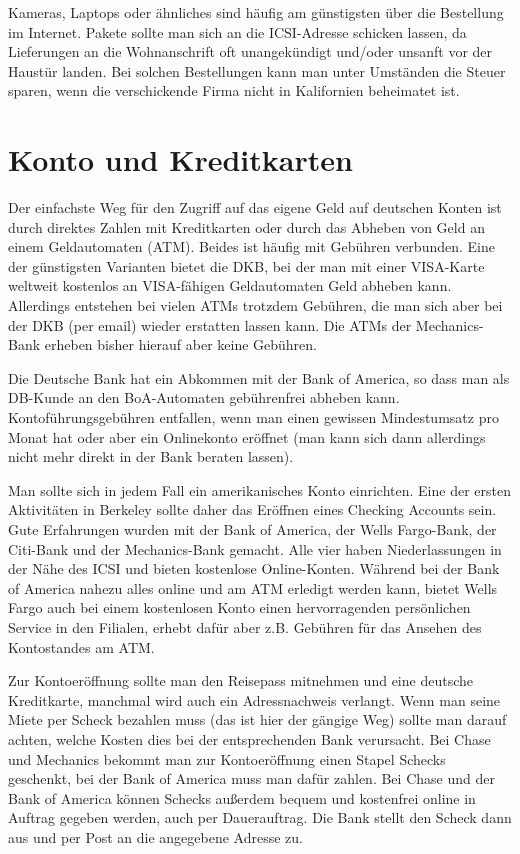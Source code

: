 \documentclass[a4paper]{scrreprt}
\begin{document}
Kameras, Laptops oder ähnliches sind häufig am günstigsten über die
Bestellung im Internet. Pakete sollte man sich an die ICSI-Adresse
schicken lassen, da Lieferungen an die Wohnanschrift oft unangekündigt
und/oder unsanft vor der Haustür landen. Bei solchen Bestellungen kann
man unter Umständen die Steuer sparen, wenn die verschickende Firma
nicht in Kalifornien beheimatet ist.


\section{Konto und Kreditkarten}

Der einfachste Weg für den Zugriff auf das eigene Geld auf deutschen Konten ist durch direktes Zahlen mit Kreditkarten oder durch das Abheben von Geld an einem Geldautomaten (ATM). Beides ist häufig mit Gebühren verbunden. Eine der günstigsten Varianten bietet die DKB, bei der man mit einer VISA-Karte weltweit kostenlos an VISA-fähigen Geldautomaten Geld abheben kann. Allerdings entstehen bei vielen ATMs trotzdem Gebühren, die man sich aber bei der DKB (per email) wieder erstatten lassen kann. Die ATMs der Mechanics-Bank erheben bisher hierauf aber keine Gebühren.

Die Deutsche Bank hat ein Abkommen mit der Bank of America, so dass man als DB-Kunde an den BoA-Automaten gebührenfrei abheben kann. Kontoführungsgebühren entfallen, wenn man einen gewissen Mindestumsatz pro Monat hat oder aber ein Onlinekonto eröffnet (man kann sich dann allerdings nicht mehr direkt in der Bank beraten lassen).

Man sollte sich in jedem Fall ein amerikanisches Konto einrichten. Eine der ersten Aktivitäten in Berkeley sollte daher das Eröffnen eines Checking Accounts sein. Gute Erfahrungen wurden mit der Bank of America, der Wells Fargo-Bank, der Citi-Bank und der Mechanics-Bank gemacht. Alle vier haben Niederlassungen in der Nähe des ICSI und bieten kostenlose Online-Konten. Während bei der Bank of America nahezu alles online und am ATM erledigt werden kann, bietet Wells Fargo auch bei einem kostenlosen Konto einen hervorragenden persönlichen Service in den Filialen, erhebt dafür aber z.B. Gebühren für das Ansehen des Kontostandes am ATM.


Zur Kontoeröffnung sollte man den Reisepass mitnehmen und eine deutsche Kreditkarte, manchmal wird auch ein Adressnachweis verlangt. Wenn man seine Miete per Scheck bezahlen muss (das ist hier der gängige Weg) sollte man darauf achten, welche Kosten dies bei der entsprechenden Bank verursacht. Bei Chase und Mechanics bekommt man zur Kontoeröffnung einen Stapel Schecks geschenkt, bei der Bank of America muss man dafür zahlen. Bei Chase und der Bank of America können Schecks außerdem bequem und kostenfrei online in Auftrag gegeben werden, auch per Dauerauftrag. Die Bank stellt den Scheck dann aus und per Post an die angegebene Adresse zu.
\end{document}

